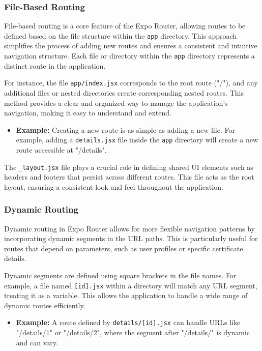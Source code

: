\subsubsection{File-Based Routing~\cite{Expo-Router-File-Based-Routing}}

File-based routing is a core feature of the Expo Router, allowing routes to be defined based on the file structure within the \texttt{app} directory. This approach simplifies the process of adding new routes and ensures a consistent and intuitive navigation structure. Each file or directory within the \texttt{app} directory represents a distinct route in the application.

For instance, the file \texttt{app/index.jsx} corresponds to the root route ("/"), and any additional files or nested directories create corresponding nested routes. This method provides a clear and organized way to manage the application's navigation, making it easy to understand and extend.

\begin{itemize}
    \item \textbf{Example:} Creating a new route is as simple as adding a new file. For example, adding a \texttt{details.jsx} file inside the \texttt{app} directory will create a new route accessible at "/details".
\end{itemize}

The \texttt{\_layout.jsx} file plays a crucial role in defining shared UI elements such as headers and footers that persist across different routes. This file acts as the root layout, ensuring a consistent look and feel throughout the application.

\subsubsection{Dynamic Routing}

Dynamic routing in Expo Router allows for more flexible navigation patterns by incorporating dynamic segments in the URL paths. This is particularly useful for routes that depend on parameters, such as user profiles or specific certificate details.

Dynamic segments are defined using square brackets in the file names. For example, a file named \texttt{[id].jsx} within a directory will match any URL segment, treating it as a variable. This allows the application to handle a wide range of dynamic routes efficiently.

\begin{itemize}
    \item \textbf{Example:} A route defined by \texttt{details/[id].jsx} can handle URLs like "/details/1" or "/details/2", where the segment after "/details/" is dynamic and can vary.
\end{itemize}

